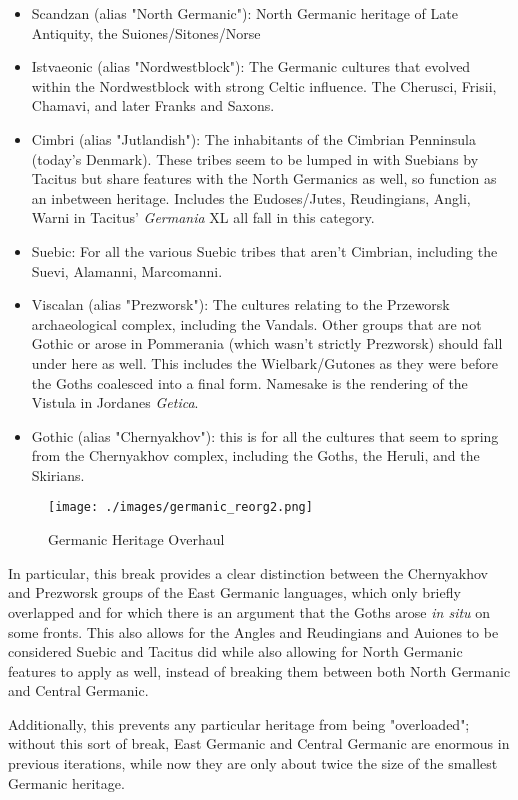 \documentclass{article}
\begin{document}
	\begin{itemize}
		\item Scandzan (alias "North Germanic"):  North Germanic heritage of Late Antiquity, the Suiones/Sitones/Norse
		\item Istvaeonic (alias "Nordwestblock"): The Germanic cultures that evolved within the Nordwestblock with strong Celtic influence.
		The Cherusci, Frisii, Chamavi, and later Franks and Saxons.
		\item Cimbri (alias "Jutlandish"): The inhabitants of the Cimbrian Penninsula (today's Denmark).
		These tribes seem to be lumped in with Suebians by Tacitus but share features with the North Germanics as well, so function as an inbetween heritage.
		Includes the Eudoses/Jutes, Reudingians, Angli, Warni in Tacitus' \textit{Germania} XL all fall in this category.
		\item Suebic: For all the various Suebic tribes that aren't Cimbrian, including the Suevi, Alamanni, Marcomanni.
		\item Viscalan (alias "Prezworsk"): The cultures relating to the Przeworsk archaeological complex, including the Vandals.
		Other groups that are not Gothic or arose in Pommerania (which wasn't strictly Prezworsk) should fall under here as well.
		This includes the Wielbark/Gutones as they were before the Goths coalesced into a final form.
		Namesake is the rendering of the Vistula in Jordanes \textit{Getica}.
		\item Gothic (alias "Chernyakhov"): this is for all the cultures that seem to spring from the Chernyakhov complex, including the Goths, the Heruli, and the Skirians.
	\end{itemize}
	
	\begin{figure}[h!]
		\centering
		\texttt{[image: ./images/germanic\_reorg2.png]}
		\caption{Germanic Heritage Overhaul}
	\end{figure}
	
	In particular, this break provides a clear distinction between the Chernyakhov and Prezworsk groups of the East Germanic languages, which only briefly overlapped and for which there is an argument that the Goths arose \textit{in situ} on some fronts.
	This also allows for the Angles and Reudingians and Auiones to be considered Suebic and Tacitus did while also allowing for North Germanic features to apply as well, instead of breaking them between both North Germanic and Central Germanic.
	
	Additionally, this prevents any particular heritage from being "overloaded"; without this sort of break, East Germanic and Central Germanic are enormous in previous iterations, while now they are only about twice the size of the smallest Germanic heritage.
	
\end{document}
